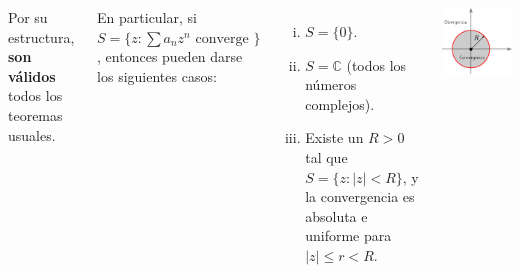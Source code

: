\documentclass[9pt, aspectratio=169]{beamer}
\begin{document}
\begin{frame}[t]
\begin{columns}[t]
        Por su estructura, \textbf{son válidos} todos los teoremas usuales.

     En particular, si $S = \{ z: \sum a_n z^n \text{ converge } \} $, entonces pueden darse los siguientes casos:
     \begin{enumerate}[i)]
         \item $ S = \{ 0\} $.
         \item $S = \mathbb{C} $ (todos los números complejos).
         \item Existe un $R > 0$ tal que $S = \{z: |z| < R \} $, y la convergencia es absoluta e uniforme para $|z| \leq r < R$.
         \end{enumerate}
         \begin{center}
             \includegraphics[scale=0.35]{figs/fig-07.pdf}
         \end{center}
 \end{columns}
\end{frame}
\end{document}
